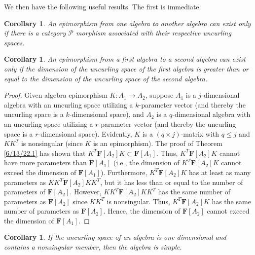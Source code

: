 \documentclass{amsart}
\numberwithin{equation}{section}
\newtheorem{corollary}[theorem]{Corollary}
\theoremstyle{definition}
\numberwithin{theorem}{section}
\begin{document}
We then have the following useful results.  The first is immediate.
\begin{corollary}\label{6/26/22.2} An epimorphism from one algebra to another algebra can exist only if there is a category $\mathcal{P}$ morphism associated with their respective uncurling spaces. \end{corollary}

\begin{corollary} \label{8/17/22.5} An epimorphism from a first algebra to a second algebra can exist only if the dimension of the uncurling space of the first algebra is greater than or equal to the dimension of the uncurling space of the second algebra. \end{corollary}  

\begin{proof} Given algebra epimorphism $K:A_1\rightarrow A_2$, suppose $A_1$ is a $j$-dimensional algebra with an uncurling space utilizing a $k$-parameter vector (and thereby the uncurling space is a $k$-dimensional space), and $A_2$ is a $q$-dimensional algebra with an uncurling space utilizing a $r$-parameter vector (and thereby the uncurling space is a $r$-dimensional space).  Evidently, $K$ is a $(q\times j)$-matrix with $q\le j$ and $KK^T$ is nonsingular (since $K$ is an epimorphism). The proof of Theorem \ref{6/13/22.1} has shown that $K^T \mathbf{F}[A_2] K \subset \mathbf{F}[A_1]$.  Thus, $K^T \mathbf{F}[A_2] K$ cannot have more parameters than $\mathbf{F}[A_1]$  (i.e., the dimension of $K^T \mathbf{F}[A_2] K$ cannot exceed the dimension of $\mathbf{F}[A_1]$).  Furthermore, $K^T \mathbf{F}[A_2] K$ has at least as many parameters as $KK^T \mathbf{F}[A_2] KK^T$, but it has less than or equal to the number of parameters of $\mathbf{F}[A_2]$.  However, $KK^T \mathbf{F}[A_2] KK^T$ has the same number of parameters as $\mathbf{F}[A_2]$ since $KK^T$ is nonsingular.  Thus, $K^T \mathbf{F}[A_2] K$ has the same number of parameters as $\mathbf{F}[A_2]$.  Hence, the dimension of $\mathbf{F}[A_2]$ cannot exceed the dimension of $\mathbf{F}[A_1]$.
\end{proof}

\begin{corollary}\label{8/17/22.1} If the uncurling space of an algebra is one-dimensional and contains a nonsingular member, then the algebra is simple. \end{corollary}
\end{document}
